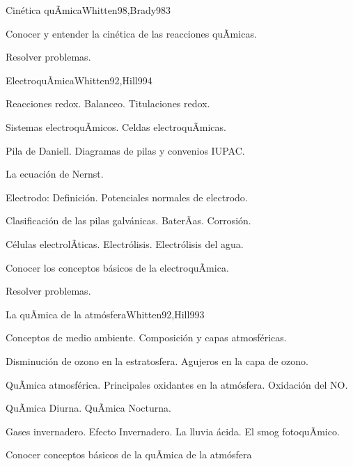\begin{syllabus}
\begin{unit}{Cinética quÃ­mica}{Whitten98,Brady98}{3}
   \begin{unitgoals}
      \item Conocer y entender la cinética de las reacciones quÃ­micas.
      \item Resolver problemas.
   \end{unitgoals}
\end{unit}

\begin{unit}{ElectroquÃ­mica}{Whitten92,Hill99}{4}
\begin{topics}
      \item Reacciones redox. Balanceo. Titulaciones redox.
      \item Sistemas electroquÃ­micos. Celdas electroquÃ­micas.
      \item Pila de Daniell. Diagramas de pilas y convenios IUPAC.
      \item La ecuación de Nernst.
      \item Electrodo: Definición. Potenciales normales de electrodo.
      \item Clasificación de las pilas galvánicas. BaterÃ­as. Corrosión.
      \item Células electrolÃ­ticas. Electrólisis. Electrólisis del agua.
   \end{topics}

   \begin{unitgoals}
      \item Conocer los conceptos básicos de la electroquÃ­mica.
      \item Resolver problemas.
   \end{unitgoals}
\end{unit}

\begin{unit}{La quÃ­mica de la atmósfera}{Whitten92,Hill99}{3}
\begin{topics}
      \item Conceptos de medio ambiente. Composición y capas atmosféricas.
      \item Disminución de ozono en la estratosfera. Agujeros en la capa de ozono.
      \item QuÃ­mica atmosférica. Principales oxidantes en la atmósfera. Oxidación del NO.
      \item QuÃ­mica Diurna. QuÃ­mica Nocturna.
      \item Gases invernadero. Efecto Invernadero. La lluvia ácida. El smog fotoquÃ­mico.
    \end{topics}

   \begin{unitgoals}
      \item Conocer conceptos básicos de la quÃ­mica de la atmósfera
   \end{unitgoals}
\end{unit}

\begin{coursebibliography}
\end{coursebibliography}
\end{syllabus}
